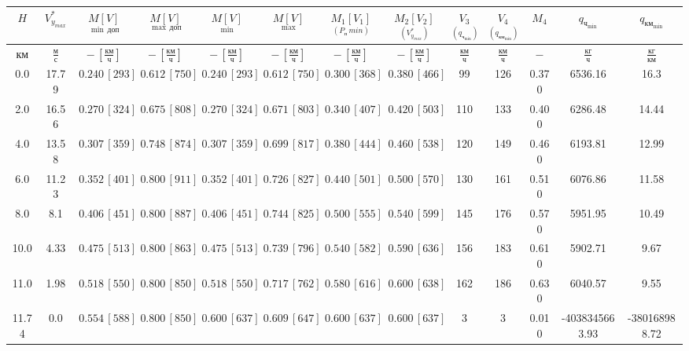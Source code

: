\begin{tabular}{|c|c|c|c|c|c|c|c|c|c|c|c|c|}
\hline
$H$ & $V_{y_{max}}^*$ & $\underset{\min \, доп}{M [V]}$ & $\underset{\max \, доп}{M [V]}$ & $\underset{\min}{M [V]}$ & $\underset{\max}{M [V]}$ & $\underset{(P_п\, min)}{M_1 [V_1]}$ & $\underset{(V_{y_{max}}^*)}{M_2 [V_2]}$ & $\underset{(q_{ч_{\min}})}{V_3}$ & $\underset{(q_{{км}_{\min}})}{V_4}$ & $M_4$ & $q_{ч_{\min}}$ & $q_{{км}_{\min}}$ \\ 
\hline
$км$ & $\frac{м}{с}$ & $-\,[\frac{км}{ч}]$ & $-\,[\frac{км}{ч}]$ & $-\,[\frac{км}{ч}]$ & $-\,[\frac{км}{ч}]$ & $-\,[\frac{км}{ч}]$ & $-\,[\frac{км}{ч}]$ & $\frac{км}{ч}$ & $\frac{км}{ч}$ & $-$ & $\frac{кг}{ч}$ & $\frac{кг}{км}$ \\ 
\hline
0.0 & 17.79 & $0.240\, [293]$ & $0.612\, [750]$ & $0.240\, [293]$ & $0.612\, [750]$ & $0.300\, [368]$ & $0.380\, [466]$ & 99 & 126 & 0.370 & 6536.16 & 16.3 \\ 
\hline
2.0 & 16.56 & $0.270\, [324]$ & $0.675\, [808]$ & $0.270\, [324]$ & $0.671\, [803]$ & $0.340\, [407]$ & $0.420\, [503]$ & 110 & 133 & 0.400 & 6286.48 & 14.44 \\ 
\hline
4.0 & 13.58 & $0.307\, [359]$ & $0.748\, [874]$ & $0.307\, [359]$ & $0.699\, [817]$ & $0.380\, [444]$ & $0.460\, [538]$ & 120 & 149 & 0.460 & 6193.81 & 12.99 \\ 
\hline
6.0 & 11.23 & $0.352\, [401]$ & $0.800\, [911]$ & $0.352\, [401]$ & $0.726\, [827]$ & $0.440\, [501]$ & $0.500\, [570]$ & 130 & 161 & 0.510 & 6076.86 & 11.58 \\ 
\hline
8.0 & 8.1 & $0.406\, [451]$ & $0.800\, [887]$ & $0.406\, [451]$ & $0.744\, [825]$ & $0.500\, [555]$ & $0.540\, [599]$ & 145 & 176 & 0.570 & 5951.95 & 10.49 \\ 
\hline
10.0 & 4.33 & $0.475\, [513]$ & $0.800\, [863]$ & $0.475\, [513]$ & $0.739\, [796]$ & $0.540\, [582]$ & $0.590\, [636]$ & 156 & 183 & 0.610 & 5902.71 & 9.67 \\ 
\hline
11.0 & 1.98 & $0.518\, [550]$ & $0.800\, [850]$ & $0.518\, [550]$ & $0.717\, [762]$ & $0.580\, [616]$ & $0.600\, [638]$ & 162 & 186 & 0.630 & 6040.57 & 9.55 \\ 
\hline
11.74 & 0.0 & $0.554\, [588]$ & $0.800\, [850]$ & $0.600\, [637]$ & $0.609\, [647]$ & $0.600\, [637]$ & $0.600\, [637]$ & 3 & 3 & 0.010 & -4038345663.93 & -380168988.72 \\ 
\hline
\end{tabular}